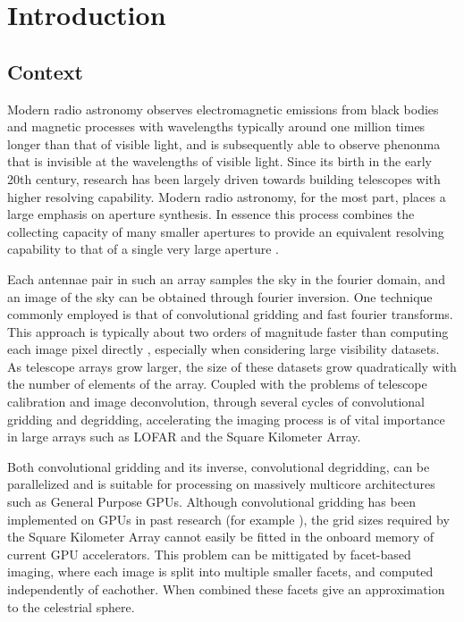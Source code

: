 \documentclass[a4paper,11pt,two column]{article}
\begin{document}
\saythanks
\section{Introduction}
\subsection{Context}
Modern radio astronomy observes electromagnetic emissions from black bodies and magnetic processes with wavelengths typically around one million times longer than that of visible light, and is subsequently 
able to observe phenonma that is invisible at the wavelengths of visible light. Since its birth in the early 20th century, research has been largely driven towards building telescopes with higher resolving capability. Modern radio astronomy, for the most part, places a large emphasis on aperture synthesis. In essence this process combines the collecting capacity of many smaller apertures to provide an equivalent
resolving capability to that of a single very large aperture \cite{christiansenradiotelescopes}. 

Each antennae pair in such an array samples the sky in the fourier domain, and an image of the sky can be obtained through fourier inversion. One technique commonly employed is that of convolutional gridding and 
fast fourier transforms. This approach is typically about two orders of magnitude faster than computing each image pixel directly \cite[Lecture 7]{taylor1999synthesis}, especially when considering large visibility datasets. As telescope arrays grow larger, 
the size of these datasets grow quadratically with the number of elements of the array. Coupled with the problems of telescope calibration and image deconvolution, through several cycles of convolutional gridding and degridding, 
accelerating the imaging process is of vital importance in large arrays such as LOFAR and the Square Kilometer Array.

Both convolutional gridding and its inverse, convolutional degridding, can be parallelized and is suitable for processing on massively multicore architectures such as General Purpose GPUs. Although convolutional gridding 
has been implemented on GPUs in past research (for example \cite{romein2012efficient}), the grid sizes required by the Square Kilometer Array cannot easily be fitted in the onboard memory of current GPU accelerators. This problem can be mittigated by facet-based
imaging, where each image is split into multiple smaller facets, and computed independently of eachother. When combined these facets give an approximation to the celestrial sphere. 
\end{document}
